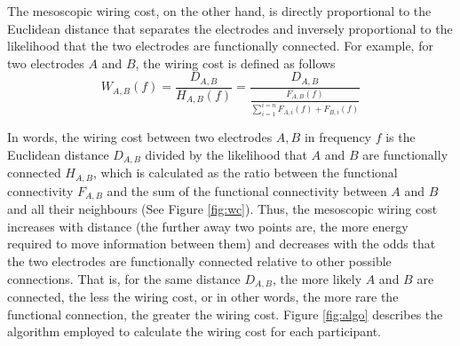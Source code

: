 \documentclass[11pt, onecolumn]{article}
\begin{document}
{The mesoscopic wiring cost, on the other hand, is directly proportional to the Euclidean distance that separates the electrodes and inversely proportional to the likelihood that the two electrodes are functionally connected. For example, for two electrodes $A$ and $B$, the wiring cost is defined as follows
\begin{equation}
 W_{A,B}(f) = \frac{D_{A,B}}{H_{A,B}(f)} = \frac{D_{A,B}}{\frac{F_{A,B}(f)}{\sum_{i=1}^{i=n}F_{A,i}(f) + F_{B,i}(f)}}
 \label{eq:mesowc}
\end{equation}

In words, the wiring cost between two electrodes $A,B$ in frequency $f$ is the Euclidean distance $D_{A,B}$ divided by the likelihood that $A$ and $B$ are functionally connected $H_{A,B}$, which is calculated as the ratio between the functional connectivity $F_{A,B}$ and the sum of the functional connectivity between $A$ and $B$ and all their neighbours (See Figure \ref{fig:wc}). Thus, the mesoscopic wiring cost increases with  distance (the further away two points are, the more energy required to move information between them) and decreases with the odds that the two electrodes are functionally connected relative to other possible connections. That is, for the same distance $D_{A,B}$, the more likely $A$ and $B$ are connected, the less the wiring cost, or in other words, the more rare the functional connection, the greater the wiring cost. 
Figure \ref{fig:algo} describes the algorithm employed to calculate the wiring cost for each participant. 

}
\end{document}
